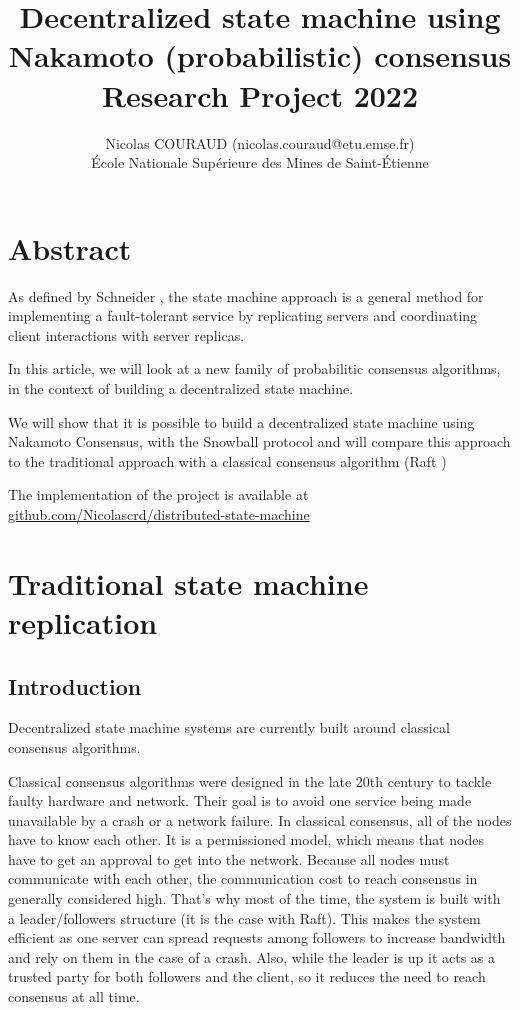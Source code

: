 \documentclass[11pt, twocolumn]{article}
\title{Decentralized state machine using Nakamoto (probabilistic) consensus\\\medskip Research Project 2022}
\author{Nicolas COURAUD (nicolas.couraud@etu.emse.fr)\\École Nationale Supérieure des Mines de Saint-Étienne}
\begin{document}
\maketitle
\onecolumn
\section*{Abstract}

As defined by Schneider \cite{stateMachine}, the state machine approach is a general method for implementing a fault-tolerant service
by replicating servers and coordinating client interactions with server replicas.

In this article, we will look at a new family of probabilitic consensus algorithms, in the context of building a decentralized state machine.

We will show that it is possible to build a decentralized state machine using Nakamoto Consensus, with the Snowball protocol \cite{snowprotocol} and will compare this approach to the traditional approach with 
a classical consensus algorithm (Raft \cite{understandable})

The implementation of the project is available at \href{https://github.com/Nicolascrd/distributed-state-machine}{github.com/Nicolascrd/distributed-state-machine}


\tableofcontents

\section{Traditional state machine replication}

\subsection{Introduction}

Decentralized state machine systems are currently built around classical consensus algorithms.

Classical consensus algorithms were designed in the late 20th century to tackle faulty hardware and network. Their goal is to avoid one service being made unavailable by a crash or a network failure. 
In classical consensus, all of the nodes have to know each other. It is a permissioned model, which means that nodes have to get an approval to get into the network.
Because all nodes must communicate with each other, the communication cost to reach consensus in generally considered high. That's why most of the time, the system is built with a leader/followers structure (it is the case with Raft). 
This makes the system efficient as one server can spread requests among followers to increase bandwidth and rely on them in the case of a crash. Also, while the leader is up it acts as a trusted party for both followers and the client, so it reduces the need to reach consensus at all time.  
\end{document}
